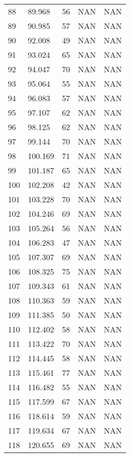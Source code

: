 \documentclass{article}
\begin{document}
\begin{longtable}{@{}lllll@{}}
				88  & 89.968  & 56    & NAN   & NAN   \\
				89  & 90.985  & 57    & NAN   & NAN   \\
				90  & 92.008  & 49    & NAN   & NAN   \\
				91  & 93.024  & 65    & NAN   & NAN   \\
				92  & 94.047  & 70    & NAN   & NAN   \\
				93  & 95.064  & 55    & NAN   & NAN   \\
				94  & 96.083  & 57    & NAN   & NAN   \\
				95  & 97.107  & 62    & NAN   & NAN   \\
				96  & 98.125  & 62    & NAN   & NAN   \\
				97  & 99.144  & 70    & NAN   & NAN   \\
				98  & 100.169 & 71    & NAN   & NAN   \\
				99  & 101.187 & 65    & NAN   & NAN   \\
				100 & 102.208 & 42    & NAN   & NAN   \\
				101 & 103.228 & 70    & NAN   & NAN   \\
				102 & 104.246 & 69    & NAN   & NAN   \\
				103 & 105.264 & 56    & NAN   & NAN   \\
				104 & 106.283 & 47    & NAN   & NAN   \\
				105 & 107.307 & 69    & NAN   & NAN   \\
				106 & 108.325 & 75    & NAN   & NAN   \\
				107 & 109.343 & 61    & NAN   & NAN   \\
				108 & 110.363 & 59    & NAN   & NAN   \\
				109 & 111.385 & 50    & NAN   & NAN   \\
				110 & 112.402 & 58    & NAN   & NAN   \\
				111 & 113.422 & 70    & NAN   & NAN   \\
				112 & 114.445 & 58    & NAN   & NAN   \\
				113 & 115.461 & 77    & NAN   & NAN   \\
				114 & 116.482 & 55    & NAN   & NAN   \\
				115 & 117.599 & 67    & NAN   & NAN   \\
				116 & 118.614 & 59    & NAN   & NAN   \\
				117 & 119.634 & 67    & NAN   & NAN   \\
				118 & 120.655 & 69    & NAN   & NAN   \\

\end{longtable}
\end{document}
